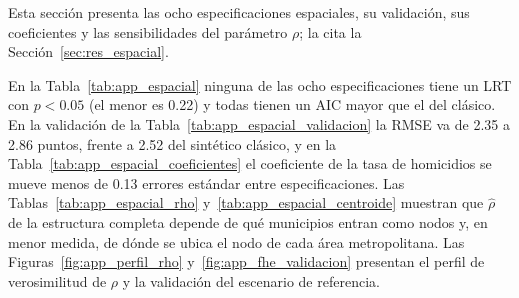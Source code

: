 Esta sección presenta las ocho especificaciones espaciales, su validación, sus coeficientes y las sensibilidades del parámetro $\rho$; la cita la Sección~\ref{sec:res_espacial}.

En la Tabla~\ref{tab:app_espacial} ninguna de las ocho especificaciones tiene un LRT con $p < 0.05$ (el menor es 0.22) y todas tienen un AIC mayor que el del clásico. En la validación de la Tabla~\ref{tab:app_espacial_validacion} la RMSE va de 2.35 a 2.86 puntos, frente a 2.52 del sintético clásico, y en la Tabla~\ref{tab:app_espacial_coeficientes} el coeficiente de la tasa de homicidios se mueve menos de 0.13 errores estándar entre especificaciones. Las Tablas~\ref{tab:app_espacial_rho} y~\ref{tab:app_espacial_centroide} muestran que $\hat{\rho}$ de la estructura completa depende de qué municipios entran como nodos y, en menor medida, de dónde se ubica el nodo de cada área metropolitana. Las Figuras~\ref{fig:app_perfil_rho} y~\ref{fig:app_fhe_validacion} presentan el perfil de verosimilitud de $\rho$ y la validación del escenario de referencia.

